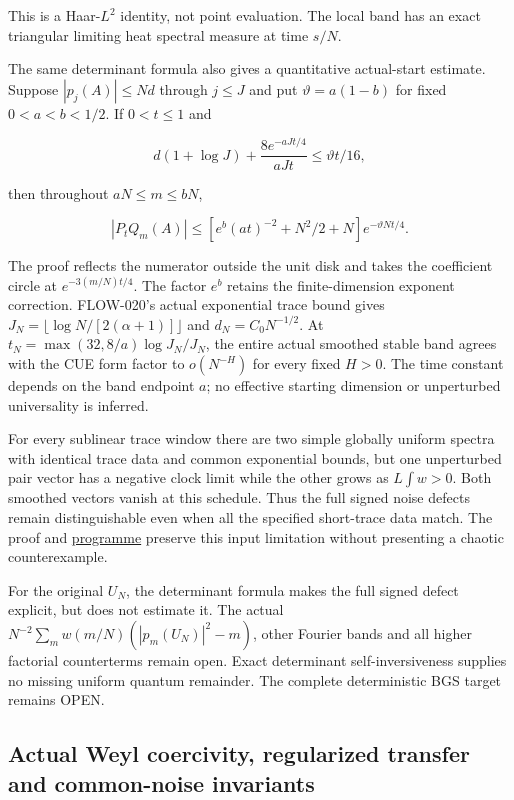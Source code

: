 This is a Haar-\(L^2\) identity, not point evaluation. The local band
has an exact triangular limiting heat spectral measure at time \(s/N\).

The same determinant formula also gives a quantitative actual-start
estimate. Suppose \(|p_j(A)|\le Nd\) through \(j\le J\) and put
\(\vartheta=a(1-b)\) for fixed \(0<a<b<1/2\). If \(0<t\le1\) and

\[
d(1+\log J)+\frac{8e^{-aJt/4}}{aJt}\le\vartheta t/16,
\]

then throughout \(aN\le m\le bN\),

\[
|P_tQ_m(A)|\le\left[e^b(at)^{-2}+N^2/2+N\right]
 e^{-\vartheta Nt/4}.
\]

The proof reflects the numerator outside the unit disk and takes the
coefficient circle at \(e^{-3(m/N)t/4}\). The factor \(e^b\) retains the
finite-dimension exponent correction. FLOW-020's actual exponential
trace bound gives \(J_N=\lfloor\log N/[2(\alpha+1)]\rfloor\) and
\(d_N=C_0N^{-1/2}\). At
\(t_N=\max(32,8/a)\log J_N/J_N\), the entire actual smoothed stable
band agrees with the CUE form factor to \(o(N^{-H})\) for every fixed
\(H>0\). The time constant depends on the band endpoint \(a\); no effective
starting dimension or unperturbed universality is inferred.

For every sublinear trace window there are two simple globally uniform
spectra with identical trace data and common exponential bounds, but
one unperturbed pair vector has a negative clock limit while the other
grows as \(L\int w>0\). Both smoothed vectors vanish at this schedule.
Thus the full signed noise defects remain distinguishable even when
all the specified short-trace data match. The proof and
\href{https://github.com/ChurilovMaksim/BGS/blob/main/archive/record/heisenberg_pair_program_20261005.md}{programme} preserve this
input limitation without presenting a chaotic counterexample.

For the original \(U_N\), the determinant formula makes the full signed
defect explicit, but does not estimate it. The actual
\(N^{-2}\sum_mw(m/N)(|p_m(U_N)|^2-m)\), other Fourier bands and all
higher factorial counterterms remain open. Exact determinant
self-inversiveness supplies no missing uniform quantum remainder.
The complete deterministic BGS target remains OPEN.

\hypertarget{actual-weyl-coercivity-regularized-transfer-and-common-noise-invariants}{%
\subsection{Actual Weyl coercivity, regularized transfer and common-noise invariants}\label{actual-weyl-coercivity-regularized-transfer-and-common-noise-invariants}}

